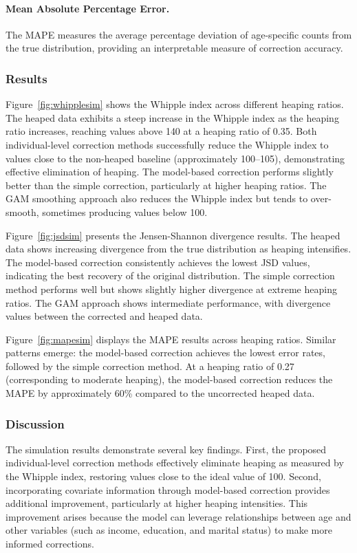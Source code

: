 \documentclass[12pt]{article}
\theoremstyle{plain}
\theoremstyle{definition}
\begin{document}
\paragraph{Mean Absolute Percentage Error.} The MAPE measures the average percentage deviation of age-specific counts from the true distribution, providing an interpretable measure of correction accuracy.

\subsubsection{Results}

Figure~\ref{fig:whipplesim} shows the Whipple index across different heaping ratios. The heaped data exhibits a steep increase in the Whipple index as the heaping ratio increases, reaching values above 140 at a heaping ratio of 0.35. Both individual-level correction methods successfully reduce the Whipple index to values close to the non-heaped baseline (approximately 100--105), demonstrating effective elimination of heaping. The model-based correction performs slightly better than the simple correction, particularly at higher heaping ratios. The GAM smoothing approach also reduces the Whipple index but tends to over-smooth, sometimes producing values below 100.

Figure~\ref{fig:jsdsim} presents the Jensen-Shannon divergence results. The heaped data shows increasing divergence from the true distribution as heaping intensifies. The model-based correction consistently achieves the lowest JSD values, indicating the best recovery of the original distribution. The simple correction method performs well but shows slightly higher divergence at extreme heaping ratios. The GAM approach shows intermediate performance, with divergence values between the corrected and heaped data.

Figure~\ref{fig:mapesim} displays the MAPE results across heaping ratios. Similar patterns emerge: the model-based correction achieves the lowest error rates, followed by the simple correction method. At a heaping ratio of 0.27 (corresponding to moderate heaping), the model-based correction reduces the MAPE by approximately 60\% compared to the uncorrected heaped data.

\subsubsection{Discussion}

The simulation results demonstrate several key findings. First, the proposed individual-level correction methods effectively eliminate heaping as measured by the Whipple index, restoring values close to the ideal value of 100. Second, incorporating covariate information through model-based correction provides additional improvement, particularly at higher heaping intensities. This improvement arises because the model can leverage relationships between age and other variables (such as income, education, and marital status) to make more informed corrections.
\end{document}
